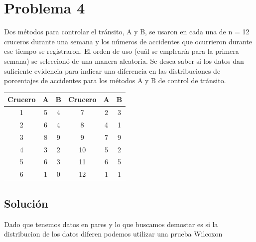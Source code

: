 \documentclass{article}
\begin{document}
\section{Problema 4}
Dos métodos para controlar el tránsito, A y B, se usaron en cada una de n = 12 cruceros durante una semana y los números de accidentes que ocurrieron durante ese tiempo se registraron. El orden de uso (cuál se emplearía para la primera semana) se seleccionó de una manera aleatoria. Se desea saber si los datos dan suficiente evidencia para indicar una diferencia en las distribuciones de porcentajes de accidentes para los métodos A y B de control de tránsito.

\begin{center}
    \begin{tabular}{c c c |c c c}
        Crucero & A & B & Crucero & A & B \\
        \hline
        1       & 5 & 4 & 7       & 2 & 3 \\
        2       & 6 & 4 & 8       & 4 & 1 \\
        3       & 8 & 9 & 9       & 7 & 9 \\
        4       & 3 & 2 & 10      & 5 & 2 \\
        5       & 6 & 3 & 11      & 6 & 5 \\
        6       & 1 & 0 & 12      & 1 & 1 \\
    \end{tabular}
\end{center}

\subsection*{Solución}
Dado que tenemos datos en pares y lo que buscamos demostar es si la distribucion de los datos diferen podemos utilizar una prueba Wilcoxon
\end{document}
